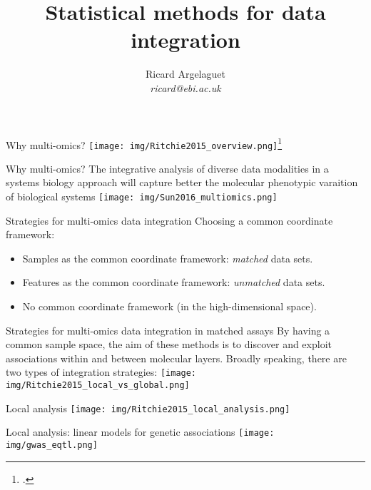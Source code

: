 \documentclass[aspectratio=169,notes]{beamer}
\title{Statistical methods for data integration}
\author{Ricard Argelaguet \\ \textit{ricard@ebi.ac.uk}}
\institute{European Bioinformatics Institute (EMBL-EBI) \\ University of Cambridge}
\begin{document}
	\begin{frame}
	\titlepage
	\end{frame}
	

	\begin{frame}{Why multi-omics?}
	\centering
	\texttt{[image: img/Ritchie2015\_overview.png]}\footcite{Ritchie2015}
	\end{frame}
	
	\begin{frame}{Why multi-omics?}
	The integrative analysis of diverse data modalities in a systems biology approach will capture better the molecular phenotypic varaition of biological systems
	\centering
	\texttt{[image: img/Sun2016\_multiomics.png]}
	\end{frame}

	\begin{frame}{Strategies for multi-omics data integration}
	Choosing a common coordinate framework:
	\begin{itemize}
		\item Samples as the common coordinate framework: \textit{matched} data sets.
		\item Features as the common coordinate framework: \textit{unmatched} data sets.
		\item No common coordinate framework (in the high-dimensional space).
	\end{itemize}	
	\end{frame}

	\begin{frame}{Strategies for multi-omics data integration in matched assays}
	By having a common sample space, the aim of these methods is to discover and exploit associations within and between molecular layers. Broadly speaking, there are two types of integration strategies:
	\centering
	\texttt{[image: img/Ritchie2015\_local\_vs\_global.png]}
	\end{frame}

	\begin{frame}{Local analysis}
	\texttt{[image: img/Ritchie2015\_local\_analysis.png]}
	\end{frame}

	\begin{frame}{Local analysis: linear models for genetic associations}
	\texttt{[image: img/gwas\_eqtl.png]}
	\end{frame}
\end{document}
